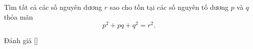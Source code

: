 \ifshowproblem
\begin{problem}\label{problem:ROU-2015-MO-7-P1}
    Tìm tất cả các số nguyên dương \( r \) sao cho tồn tại các số nguyên tố dương \( p \) và \( q \) thỏa mãn
    \[
        p^2 + pq + q^2 = r^2.
    \]
\end{problem}
\fi

\ifshowinfo
Đánh giá [\textbf{}]\footnotemark
{}
\fi